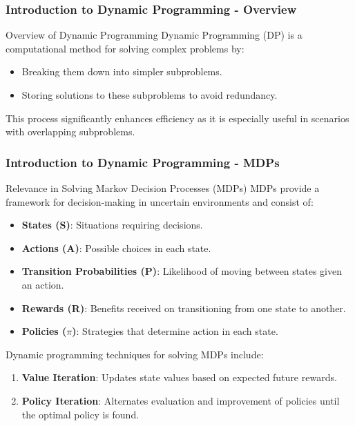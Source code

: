 \documentclass[aspectratio=169]{beamer}
\begin{document}
\frame{\titlepage}

\begin{frame}[fragile]
    \frametitle{Introduction to Dynamic Programming - Overview}
    \begin{block}{Overview of Dynamic Programming}
        Dynamic Programming (DP) is a computational method for solving complex problems by:
        \begin{itemize}
            \item Breaking them down into simpler subproblems.
            \item Storing solutions to these subproblems to avoid redundancy.
        \end{itemize}
        This process significantly enhances efficiency as it is especially useful in scenarios with overlapping subproblems.
    \end{block}
\end{frame}

\begin{frame}[fragile]
    \frametitle{Introduction to Dynamic Programming - MDPs}
    \begin{block}{Relevance in Solving Markov Decision Processes (MDPs)}
        MDPs provide a framework for decision-making in uncertain environments and consist of:
        \begin{itemize}
            \item \textbf{States (S)}: Situations requiring decisions.
            \item \textbf{Actions (A)}: Possible choices in each state.
            \item \textbf{Transition Probabilities (P)}: Likelihood of moving between states given an action.
            \item \textbf{Rewards (R)}: Benefits received on transitioning from one state to another.
            \item \textbf{Policies ($\pi$)}: Strategies that determine action in each state.
        \end{itemize}
        Dynamic programming techniques for solving MDPs include:
        \begin{enumerate}
            \item \textbf{Value Iteration}: Updates state values based on expected future rewards.
            \item \textbf{Policy Iteration}: Alternates evaluation and improvement of policies until the optimal policy is found.
        \end{enumerate}
    \end{block}
\end{frame}
\end{document}
